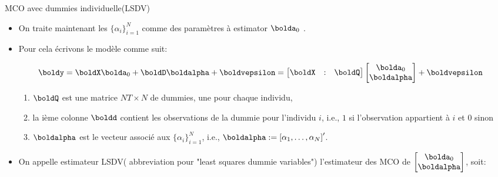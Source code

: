 \begin{frame}[allowframebreaks]{MCO avec dummies individuelle(LSDV)}
    \begin{itemize}
    \item On traite maintenant les $\{\alpha_i\}_{i=1}^N$ comme des paramètres à estimator $\bolda_0$ .
    
    \item Pour cela écrivons le modèle comme suit:
    
    \begin{align*}
        \boldy &= \boldX\bolda_0 + \boldD \boldalpha  + \boldvepsilon =  
        \begin{bmatrix}
        \boldX&:&  \boldQ
        \end{bmatrix}
        \begin{bmatrix}
        \bolda_0\\
        \boldalpha
        \end{bmatrix} + \boldvepsilon
        \end{align*}

        \begin{enumerate}[$\star$]
            \item $\boldQ$ est une matrice $N T\times N$ de dummies, une pour chaque individu,
            \item la ième colonne $\boldd$ contient les observations de la dummie pour l'individu $i$, 
            i.e., $1$ si l'observation appartient à $i$ et $0$ sinon
            \item  $\boldalpha$ est le vecteur associé aux 
            $\{\alpha_i\}_{i=1}^N$, i.e., $\boldalpha:=\left[\alpha_1, \ldots, \alpha_N\right]^\prime$.
        \end{enumerate}

        \item On appelle estimateur  LSDV( abbreviation pour "least squares dummie variables")
        l'estimateur des MCO de
         $\begin{bmatrix}
           \bolda_0\\
            \boldalpha
          \end{bmatrix}$, soit:


\end{itemize}
\end{frame}
